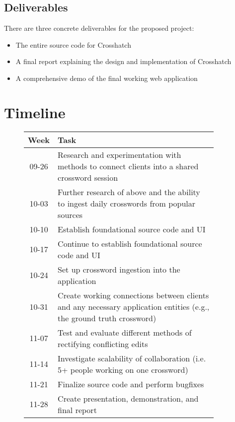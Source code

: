 \documentclass{article}
\begin{document}
\subsection{Deliverables}
There are three concrete deliverables for the proposed project:
\begin{itemize}
  \item The entire source code for Crosshatch
  \item A final report explaining the design and implementation of Crosshatch
  \item A comprehensive demo of the final working web application
\end{itemize}

\section{Timeline}
\label{timeline}
\begin{figure}[h]
  \centering
  \begin{tabular}{| c | p{0.9\linewidth} |}
    \hline
    \textbf{Week} & \textbf{Task} \\ \hline
    09-26 & Research and experimentation with methods to connect
            clients into a shared crossword session \\ \hline
    10-03 & Further research of above and the ability to
            ingest daily crosswords from popular sources \\ \hline
    10-10 & Establish foundational source code and UI \\ \hline
    10-17 & Continue to establish foundational source code and UI \\ \hline
    10-24 & Set up crossword ingestion into the application \\ \hline
    10-31 & Create working connections between clients and any
            necessary application entities (e.g., the ground truth crossword) \\ \hline
    11-07 & Test and evaluate different methods of rectifying conflicting edits  \\ \hline
    11-14 & Investigate scalability of collaboration (i.e. 5+ people working on one crossword) \\ \hline
    11-21 & Finalize source code and perform bugfixes \\ \hline
    11-28 & Create presentation, demonstration, and final report \\ \hline

    \end{tabular}
\end{figure}
\end{document}
